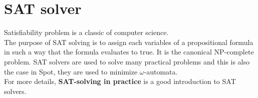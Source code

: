 \section{SAT solver}
Satisfiability problem is a classic of computer science.\\

The purpose of SAT solving is to assign each variables of a propositional formula in such a way that the
formula evaluates to true. It is the canonical NP-complete problem. SAT solvers are used to solve many
practical problems and this is also the case in Spot, they are used to minimize $\omega$-automata.\\

For more details, \textbf{SAT-solving in practice} \cite{16} is a good introduction to SAT solvers.